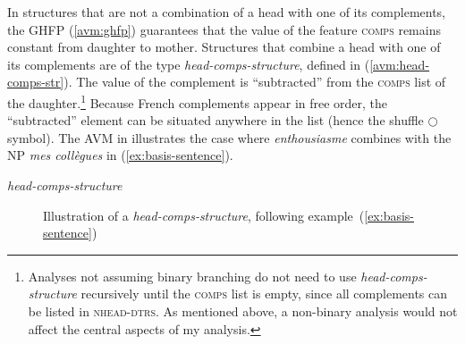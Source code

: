 In structures that are not a combination of a head with one of its complements, the GHFP (\ref{avm:ghfp}) guarantees that the value of the feature \textsc{comps} remains constant from daughter to mother. Structures that combine a head with one of its complements are of the type \emph{head-comps-structure}, defined in (\ref{avm:head-comps-str}). The value of the complement is ``subtracted'' from the \textsc{comps} list of the daughter.\footnote{Analyses not assuming binary branching do not need to use \textit{head-comps-structure} recursively until the \textsc{comps} list is empty, since all complements can be listed in \textsc{nhead-dtrs}. As mentioned above, a non-binary analysis would not affect the central aspects of my analysis.} Because French complements appear in free order, the ``subtracted'' element can be situated anywhere in the list (hence the shuffle $\bigcirc$ symbol). The AVM in  illustrates the case where \emph{enthousiasme} combines with the NP \emph{mes collègues} in (\ref{ex:basis-sentence}).

\ea \textit{head-comps-structure}
\label{avm:head-comps-str}
\z 

\begin{figure}[ht]
\caption{Illustration of a \textit{head-comps-structure}, following example~(\ref{ex:basis-sentence})}
\label{fig:ex:avm-comps-verb}
\end{figure}

